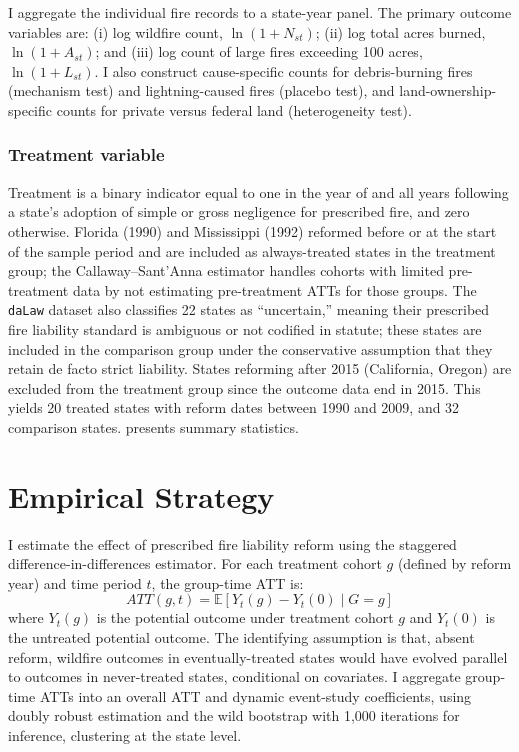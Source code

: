 \documentclass[12pt]{article}
\newcommand{\E}{\mathbb{E}}
\begin{document}
I aggregate the individual fire records to a state-year panel. The primary outcome variables are: (i) log wildfire count, $\ln(1 + N_{st})$; (ii) log total acres burned, $\ln(1 + A_{st})$; and (iii) log count of large fires exceeding 100 acres, $\ln(1 + L_{st})$. I also construct cause-specific counts for debris-burning fires (mechanism test) and lightning-caused fires (placebo test), and land-ownership-specific counts for private versus federal land (heterogeneity test).

\subsubsection*{Treatment variable} Treatment is a binary indicator equal to one in the year of and all years following a state's adoption of simple or gross negligence for prescribed fire, and zero otherwise. Florida (1990) and Mississippi (1992) reformed before or at the start of the sample period and are included as always-treated states in the treatment group; the Callaway--Sant'Anna estimator handles cohorts with limited pre-treatment data by not estimating pre-treatment ATTs for those groups. The \texttt{daLaw} dataset also classifies 22 states as ``uncertain,'' meaning their prescribed fire liability standard is ambiguous or not codified in statute; these states are included in the comparison group under the conservative assumption that they retain de facto strict liability. States reforming after 2015 (California, Oregon) are excluded from the treatment group since the outcome data end in 2015. This yields 20 treated states with reform dates between 1990 and 2009, and 32 comparison states.  presents summary statistics.



\section{Empirical Strategy}

I estimate the effect of prescribed fire liability reform using the \citet{CallawayS2021} staggered difference-in-differences estimator. For each treatment cohort $g$ (defined by reform year) and time period $t$, the group-time ATT is:
\begin{equation}
ATT(g,t) = \E[Y_{t}(g) - Y_{t}(0) \mid G = g]
\end{equation}
where $Y_t(g)$ is the potential outcome under treatment cohort $g$ and $Y_t(0)$ is the untreated potential outcome. The identifying assumption is that, absent reform, wildfire outcomes in eventually-treated states would have evolved parallel to outcomes in never-treated states, conditional on covariates. I aggregate group-time ATTs into an overall ATT and dynamic event-study coefficients, using doubly robust estimation and the wild bootstrap with 1,000 iterations for inference, clustering at the state level.
\end{document}
